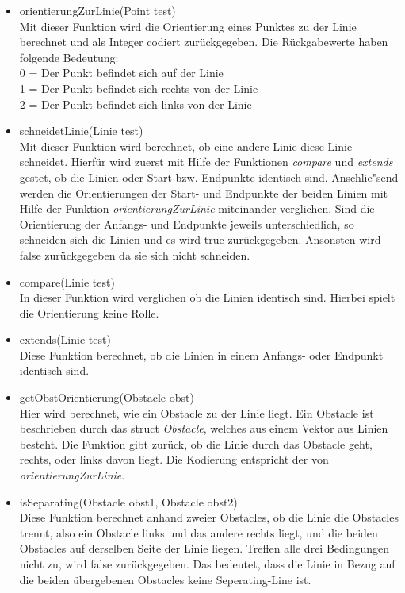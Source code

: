 \documentclass[a4paper]{scrartcl}
\begin{document}
\begin{itemize}
\item orientierungZurLinie(Point test)\\
Mit dieser Funktion wird die Orientierung eines Punktes zu der Linie berechnet und als Integer codiert zurückgegeben. Die Rückgabewerte haben folgende Bedeutung:\\
0 = Der Punkt befindet sich auf der Linie\\
1 = Der Punkt befindet sich rechts von der Linie\\
2 = Der Punkt befindet sich links von der Linie\\
\item schneidetLinie(Linie test)\\
Mit dieser Funktion wird berechnet, ob eine andere Linie diese Linie schneidet. Hierfür wird zuerst mit Hilfe der Funktionen \textit{compare} und \textit{extends} gestet, ob die Linien oder Start bzw. Endpunkte identisch sind. Anschlie"send werden die Orientierungen der Start- und Endpunkte der beiden Linien mit Hilfe der Funktion \textit{orientierungZurLinie} miteinander verglichen. Sind die Orientierung der Anfangs- und Endpunkte jeweils unterschiedlich, so schneiden sich die Linien und es wird true zurückgegeben. Ansonsten wird false zurückgegeben da sie sich nicht schneiden.
\item compare(Linie test)\\
In dieser Funktion wird verglichen ob die Linien identisch sind. Hierbei spielt die Orientierung keine Rolle.
\item extends(Linie test)\\
Diese Funktion berechnet, ob die Linien in einem Anfangs- oder Endpunkt identisch sind. 
\item getObstOrientierung(Obstacle obst)\\
Hier wird berechnet, wie ein Obstacle zu der Linie liegt. Ein Obstacle ist beschrieben durch das struct \textit{Obstacle}, welches aus einem Vektor aus Linien besteht. Die Funktion gibt zurück, ob die Linie durch das Obstacle geht, rechts, oder links davon liegt. Die Kodierung entspricht der von \textit{orientierungZurLinie}.
\item isSeparating(Obstacle obst1, Obstacle obst2)\\
Diese Funktion berechnet anhand zweier Obstacles, ob die Linie die Obstacles trennt, also ein Obstacle links und das andere rechts liegt, und die beiden Obstacles auf derselben Seite der Linie liegen. Treffen alle drei Bedingungen nicht zu, wird false zurückgegeben. Das bedeutet, dass die Linie in Bezug auf die beiden übergebenen Obstacles keine Seperating-Line ist.

\end{itemize}
\end{document}

